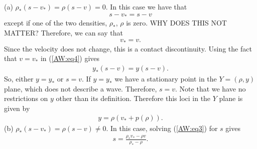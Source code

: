 \documentclass{article}
\begin{document}
(a) $\rho_*(s - v_*) = \rho (s - v) = 0$. In this case we have that
\begin{align*}
s - v_* = s - v 
\end{align*}
except if one of the two densities, $\rho_*$, $\rho$ is zero. WHY DOES THIS NOT MATTER? Therefore, we can say that
\begin{align*}
v_* = v.
\end{align*}
Since the velocity does not change, this is a contact discontinuity. Using the fact that $v = v_*$ in (\ref{AW:eq4}) gives
\begin{align*}
y_*(s - v) = y(s - v).
\end{align*}
So, either $y = y_*$ or $s = v$. If $y = y_*$ we have a stationary point in the $Y = (\rho, y)$ plane, which does not 
describe a wave. Therefore, $s = v$. Note that we have no restrictions on $y$ other than its definition. 
Therefore this loci in the $Y$ plane is given by 
\begin{align*}
y = \rho ( v_* + p(\rho )).
\end{align*}
(b) $\rho_*(s - v_*) = \rho (s - v) \neq 0$. In this case, solving (\ref{AW:eq3}) for $s$ gives
\begin{align*}
s = \frac{\rho_*v_* - \rho v}{\rho_* - \rho}.
\end{align*}
\end{document}
